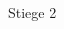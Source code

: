 \documentclass[a4paper]{article}
\begin{document}
\printVSLEventHeader{}{}
\begin{vsltext}{3cm}{3.5cm}

    \vspace{3cm}

    \Stair{2cm} Stiege 2
\end{vsltext}
\end{document}

